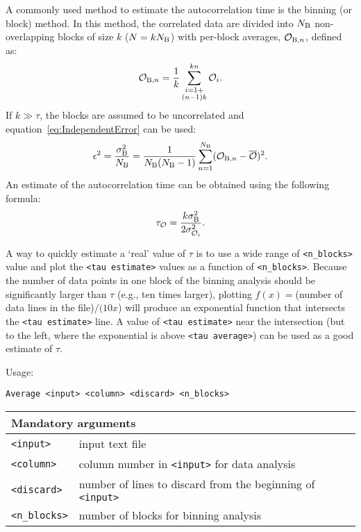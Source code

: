 A commonly used method to estimate the autocorrelation time
is the binning (or block) method. In this method, the correlated data are
divided into $N_{\mathrm{B}}$ non-overlapping blocks of size $k$ ($N=k
N_{\mathrm{B}}$) with per-block averages, $\mathcal{O}_{\mathrm{B},n}$,
defined as:
\begin{equation} \label{eq:BlockAverage} %
  \mathcal{O}_{\mr{B},n} = \frac{1}{k}
    \sum^{k n}_{\substack{i=1+\\(n-1)k}} \mathcal{O}_i.
\end{equation} %
If $k\gg\tau$, the blocks are assumed to be uncorrelated and
equation~\eqref{eq:IndependentError} can be used:
\begin{equation} \label{eq:Error} %
  \epsilon^2 =
  \frac{\sigma^2_{\mr{B}} }{N_{\mr{B}} } = \frac{1}{N_{\mr{B}} (N_{\mr{B}}
  -1)} \sum^{N_{\mr{B}} }_{n=1} (\mathcal{O}_{\mr{B},n} -
  \overline{\mathcal{O}})^2.
\end{equation} %
An estimate of the autocorrelation time can be obtained using the following
formula:
\begin{equation} \label{eq:tau} %
  \tau_{\mathcal{O}} = \frac{k \sigma^2_{\mr{B}} }{2
  \sigma^2_{\mathcal{O}_i}}.
\end{equation} %

A way to quickly estimate a `real' value of $\tau$ is to use a wide range
of \texttt{<n\_blocks>} value and plot the \texttt{<tau estimate>} values
as a function of \texttt{<n\_blocks>}. Because the number of data points in
one block of the binning analysis should be significantly larger than
$\tau$ (e.g., ten times larger), plotting $f(x)=$(number of data lines in
the file)$/(10x$) will produce an exponential function that intersects the
\texttt{<tau estimate>} line. A value of \texttt{<tau estimate>} near the
intersection (but to the left, where the exponential is above \texttt{<tau
average>}) can be used as a good estimate of $\tau$.

Usage:

\vspace{1em}
\noindent
\texttt{Average <input> <column> <discard> <n\_blocks>}

\noindent
\begin{longtable}{p{}p{}}
  \toprule
  \multicolumn{2}{l}{Mandatory arguments} \\
  \midrule
  \texttt{<input>} & input text file \\
  \texttt{<column>} & column number in \texttt{<input>} for data analysis \\
  \texttt{<discard>} & number of lines to discard from the beginning of
    \texttt{<input>} \\
  \texttt{<n\_blocks>} & number of blocks for binning analysis \\
  \bottomrule
\end{longtable}
